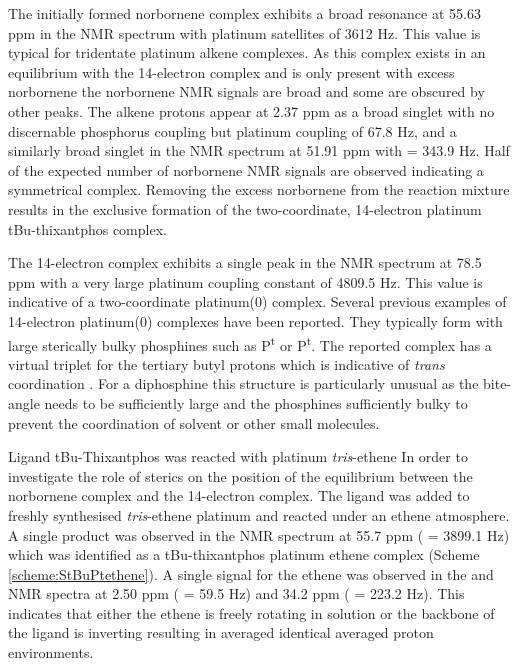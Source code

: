 
The initially formed norbornene complex  exhibits a broad resonance at 55.63 ppm in the \phosphorus{} NMR spectrum with platinum satellites of 3612 Hz.  This value is typical for tridentate platinum alkene complexes. As this complex exists in an equilibrium with the 14-electron complex and is only present with excess norbornene the norbornene NMR signals are broad and some are obscured by other peaks.  The alkene protons appear at 2.37 ppm as a broad singlet with no discernable phosphorus coupling but platinum coupling of 67.8 Hz, and a similarly broad singlet in the \carbon{} NMR spectrum at 51.91 ppm with \JPtC{} = 343.9 Hz.  Half of the expected number of norbornene NMR signals are observed indicating a symmetrical complex.  Removing the excess norbornene  from the reaction mixture results in the exclusive formation of the two-coordinate, 14-electron platinum tBu-thixantphos complex.

The 14-electron complex  exhibits a single peak in the \phosphorus{} NMR spectrum at 78.5 ppm with a very large platinum coupling constant of 4809.5 Hz.  This value is indicative of a two-coordinate platinum(0) complex.  Several previous examples of 14-electron platinum(0) complexes have been reported.\cite{Goel1981c, Otsuka1976}  They typically form with large sterically bulky phosphines such as P\textsuperscript{t} or P\textsuperscript{t}.  The reported complex  has a virtual triplet for the tertiary butyl protons which is indicative of \emph{trans} coordination \cite{Harris1964}.  For a diphosphine this structure is particularly unusual as the bite-angle needs to be sufficiently large and the phosphines sufficiently bulky to prevent the coordination of solvent or other small molecules.  

Ligand  tBu-Thixantphos was reacted with platinum \emph{tris}-ethene In order to investigate the role of sterics on the position of the equilibrium between the norbornene complex and the 14-electron complex.  The ligand was added to freshly synthesised \emph{tris}-ethene platinum and reacted under an ethene atmosphere.  A single product was observed in the \phosphorus{} NMR spectrum at 55.7 ppm (\JPtP{} = 3899.1 Hz) which was identified as a tBu-thixantphos platinum ethene complex (Scheme \ref{scheme:StBuPtethene}).  A single signal for the ethene was observed in the \proton{} and \carbon{} NMR spectra at 2.50 ppm (\JPtH{} = 59.5 Hz) and 34.2 ppm (\JPtC{} = 223.2 Hz).  This indicates that either the ethene is freely rotating in solution or the backbone of the ligand is inverting resulting in averaged identical averaged proton environments.  

